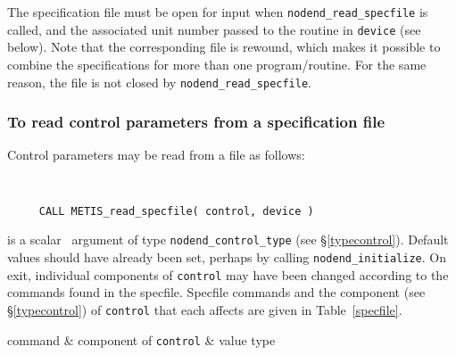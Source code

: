 \documentclass{galahad}
\newcommand{\packagename}{nodend}
\begin{document}
\begin{description}
The specification file must be open for
input when {\tt \packagename\_read\_specfile}
is called, and the associated unit number
passed to the routine in {\tt device} (see below).
Note that the corresponding
file is rewound, which makes it possible to combine the specifications
for more than one program/routine.  For the same reason, the file is not
closed by {\tt \packagename\_read\_specfile}.

\subsubsection{To read control parameters from a specification file}
\label{readspec}

Control parameters may be read from a file as follows:
\hskip0.5in

\def\baselinestretch{0.8}
{\tt
\begin{verbatim}
     CALL METIS_read_specfile( control, device )
\end{verbatim}
}
\def\baselinestretch{1.0}

\begin{description}
 is a scalar \intentinout\ argument of type
{\tt \packagename\_control\_type}
(see \S\ref{typecontrol}).
Default values should have already been set, perhaps by calling
{\tt \packagename\_initialize}.
On exit, individual components of {\tt control} may have been changed
according to the commands found in the specfile. Specfile commands and
the component (see \S\ref{typecontrol}) of {\tt control}
that each affects are given in Table~\ref{specfile}.

\hline
  command & component of {\tt control} & value type \\
\hline



\end{description}
\end{description}
\end{document}
